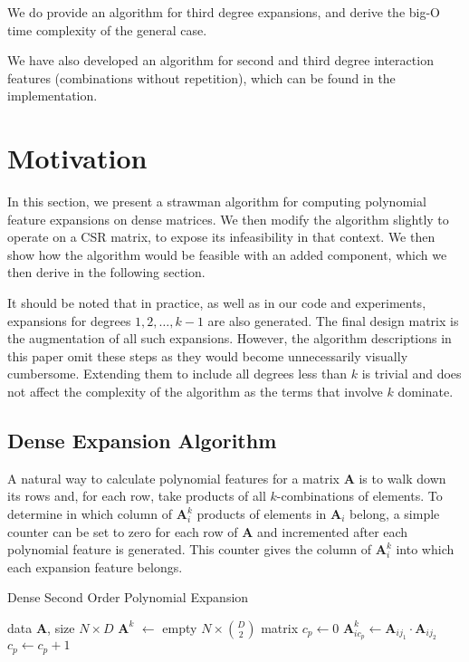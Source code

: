 \documentclass{article}
\begin{document}
We do provide an algorithm for third degree expansions, and derive the big-O time complexity of the general case.

We have also developed an algorithm for second and third degree interaction features (combinations without repetition), which can be found in the implementation.

\section{Motivation}
In this section, we present a strawman algorithm for computing polynomial feature expansions on dense matrices.
We then modify the algorithm  slightly to operate on a CSR matrix, to expose its infeasibility in that context.
We then show how the algorithm would be feasible with an added component, which we then derive in the following section.

It should be noted that in practice, as well as in our code and experiments, expansions for degrees $1, 2, \dots, k-1$ are also generated.
The final design matrix is the augmentation of all such expansions.
However, the algorithm descriptions in this paper omit these steps as they would become unnecessarily visually cumbersome.
Extending them to include all degrees less than $k$ is trivial and does not affect the complexity of the algorithm as the terms that involve $k$ dominate.

\subsection{Dense Expansion Algorithm}
A natural way to calculate polynomial features for a matrix $\bm{A}$ is to walk down its rows and, for each row, take products of all $k$-combinations of elements.
To determine in which column of $\bm{A}^k_i$ products of elements in $\bm{A}_i$ belong, a simple counter can be set to zero for each row of $\bm{A}$ and incremented after each polynomial feature is generated.
This counter gives the column of $\bm{A}^k_i$ into which each expansion feature belongs.

\begin{algorithm}[H]
   \caption{Dense Second Order Polynomial Expansion}
   \label{alg:Dense-Second-Order-Polynomial-Expansion}
\begin{algorithmic}[1]
    data $\bm{A}$, size $N \times D$
   \STATE $\bm{A}^k$ $\gets$ empty $N \times \binom{D}{2}$ matrix
      \STATE $c_p \gets 0$
              \STATE $\bm{A}^k_{i{c_p}} \gets \bm{A}_{ij_1} \cdot \bm{A}_{ij_2}$
              \STATE $c_p \gets c_p + 1$
          \ENDFOR
      \ENDFOR
   \ENDFOR
\end{algorithmic}
\end{algorithm}
\end{document}

